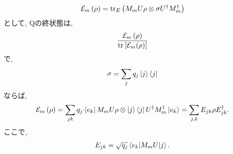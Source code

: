 \begin{ex}
    \label{ex8.7}
    \begin{align*}
        \mathcal{E}_m \left( \rho \right)
        =
        \mathrm{tr}_E \left( M_m U \rho \otimes \sigma U^\dagger M_m^\dagger \right)
    \end{align*}
    として, Qの終状態は,
    \begin{align*}
        \frac{\mathcal{E}_m \left( \rho \right)}{\mathrm{tr} \left[ \mathcal{E}_m(\rho)\right]}
    \end{align*}
    で,
    \begin{align*}
        \sigma = \sum_j q_j \ket{j}\bra{j}
    \end{align*}
    ならば,
    \begin{align*}
        \mathcal{E}_m \left( \rho \right)
        =
        \sum_{jk} q_j \bra{e_k} M_m U \rho \otimes \ket{j}\bra{j} U^\dagger M_m^\dagger \ket{e_k}
        =
        \sum_{j,k}E_{jk} \rho E_{jk}^\dagger.
    \end{align*}
    ここで,
    \begin{align*}
        E_{jk} = \sqrt{q_j} \braket{e_k | M_m U | j}.
    \end{align*}
\end{ex}

\begin{ex}
    \label{ex8.8}
\end{ex}

